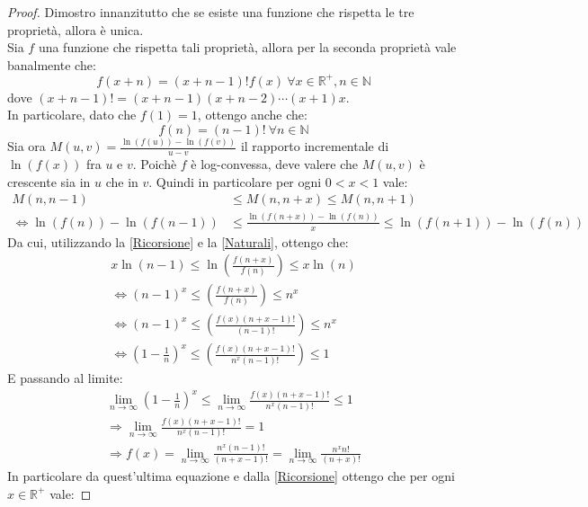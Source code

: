 \begin{proof}
Dimostro innanzitutto che se esiste una funzione che rispetta le tre proprietà, allora è unica.\\
Sia $f$ una funzione che rispetta tali proprietà, allora per la seconda proprietà vale banalmente che:
\begin{equation}
 \label{Ricorsione}
 f(x+n)=(x+n-1)!f(x)\ \forall x\in \mathbb{R}^+, n\in\mathbb{N}
\end{equation}
dove $(x+n-1)!=(x+n-1)(x+n-2)\cdots(x+1)x$.\\
In particolare, dato che $f(1)=1$, ottengo anche che:
\begin{equation}
 \label{Naturali}
 f(n)=(n-1)!\ \forall n\in \mathbb{N}
\end{equation}
Sia ora $M(u,v)=\frac{\ln(f(u))-\ln(f(v))}{u-v}$ il rapporto incrementale
di $\ln(f(x))$ fra $u$ e $v$. Poichè $f$ è log-convessa, deve valere che $M(u,v)$ è crescente sia in $u$ che in $v$.
Quindi in particolare per ogni $0<x<1$ vale:
\begin{equation*}
 \begin{split}
  M(n,n-1) & \le M(n,n+x) \le M(n,n+1) \\
  \iff \ln(f(n))-\ln(f(n-1)) & \le \frac{\ln(f(n+x))-\ln(f(n))}{x} \le \ln(f(n+1))-\ln(f(n)) 
  \end{split}
\end{equation*}
Da cui, utilizzando la \cref{Ricorsione} e la \cref{Naturali}, ottengo che:
\begin{gather*}
  x \ln(n-1) \le \ln \left( \frac{f(n+x)}{f(n)} \right) \le x\ln(n)\\
  \iff (n-1)^x \le \left( \frac{f(n+x)}{f(n)} \right) \le n^x \\
  \iff (n-1)^x \le \left( \frac{f(x)(n+x-1)!}{(n-1)!} \right) \le n^x \\
  \iff \left(1-\frac{1}{n}\right)^x \le \left( \frac{f(x)(n+x-1)!}{n^x(n-1)!} \right) \le 1
\end{gather*}
E passando al limite:
 \begin{gather*}
  \lim_{n\rightarrow \infty} \left(1-\frac{1}{n}\right)^x \le \lim_{n\rightarrow \infty}  \frac{f(x)(n+x-1)!}{n^x(n-1)!} \le 1 \\
  \Longrightarrow \lim_{n\rightarrow \infty} \frac{f(x)(n+x-1)!}{n^x(n-1)!}  = 1 \\
  \Longrightarrow f(x) = \lim_{n\rightarrow \infty} \frac{n^x(n-1)!}{(n+x-1)!}=\lim_{n\rightarrow \infty} \frac{n^xn!}{(n+x)!}
 \end{gather*}
In particolare da quest'ultima equazione e dalla \cref{Ricorsione} ottengo che per ogni $x\in\mathbb{R}^+$ vale:

\end{proof}
